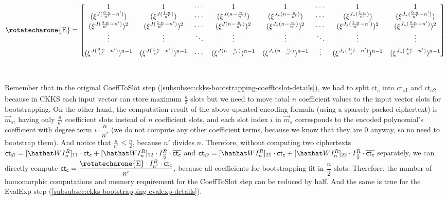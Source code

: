 {\footnotesize{\hspace{-1cm}\noindent $\text{\rotatecharone{E}} = \begin{bmatrix}
1 & 1 & \cdots & 1 & 1 & \cdots & 1 & 1\\
(\xi^{J(\frac{0\cdot n}{n'}-n')}) & (\xi^{J(\frac{1\cdot n}{n'})}) & \cdots & (\xi^{J(n-\frac{n}{n'})}) & (\xi^{J_*(n-\frac{n}{n'})}) & \cdots & (\xi^{J_*(\frac{1\cdot n}{n'})}) & (\xi^{J_*(\frac{0\cdot n}{n'}-n')})\\
(\xi^{J(\frac{0\cdot n}{n'}-n')})^2 & (\xi^{J(\frac{1\cdot n}{n'}-n')})^2 & \cdots & (\xi^{J(n-\frac{n}{n'})})^2 & (\xi^{J_*(n-\frac{n}{n'})})^2 & \cdots & (\xi^{J_*(\frac{1\cdot n}{n'}-n')})^2 & (\xi^{J_*(\frac{0\cdot n}{n'}-n')})^2 \\
\vdots & \vdots & \ddots & \vdots & \vdots & \ddots & \vdots & \vdots \\
(\xi^{J(\frac{0\cdot n}{n'}-n')})^{n-1} & (\xi^{J(\frac{1\cdot n}{n'}-n')})^{n-1} & \cdots & (\xi^{J(n-\frac{n}{n'})})^{n-1} & (\xi^{J_*(n-\frac{n}{n'})})^{n-1} & \vdots & (\xi^{J_*(\frac{1\cdot n}{n'}-n')})^{n-1} & (\xi^{J_*(\frac{0\cdot n}{n'}-n')})^{n-1} 
\end{bmatrix}$}}

$ $

Remember that in the original \textsf{CoeffToSlot} step (\autoref{subsubsec:ckks-bootstrapping-coefftoslot-details}), we had to split \textsf{ct\textsubscript{s}} into \textsf{ct\textsubscript{s1}} and \textsf{ct\textsubscript{s2}} because in CKKS each input vector can store maximum $\frac{n}{2}$ slots but we need to move total $n$ coefficient values to the input vector slots for bootstrapping. On the other hand, the computation result of the above updated encoding formula (using a sparsely packed ciphertext) is $\vec{m}_s$, having only $\frac{n}{n'}$ coefficient slots instead of $n$ coefficient slots, and each slot index $i$ in $\vec{m}_s$ corresponds to the encoded polynomial's coefficient with degree term $i \cdot \dfrac{n}{n'}$ (we do not compute any other coefficient terms, because we know that they are 0 anyway, so no need to bootstrap them). And notice that $\frac{n}{n'} \leq \frac{n}{2}$, because $n'$ divides $n$. Therefore, without computing two ciphertexts $\textsf{ct}_{\textsf{s1}} = [\hathat WI_n^R]_{11} \cdot \textsf{ct\textsubscript{c}} + [\hathat WI_n^R]_{12} \cdot I_{\frac{n}{2}}^R \cdot \mathit{\overline{\textsf{ct\textsubscript{c}}}}$ and $\textsf{ct}_{\textsf{s2}} = [\hathat WI_n^R]_{21} \cdot \textsf{ct\textsubscript{c}} + [\hathat WI_n^R]_{22} \cdot I_{\frac{n}{2}}^R \cdot \mathit{\overline{\textsf{ct\textsubscript{c}}}}$ separately, we can directly compute $\textsf{ct\textsubscript{c}} = \dfrac{ \text{\rotatecharone{E}} \cdot I_{n'}^R \cdot \textsf{ct\textsubscript{c}}}{n'}$, because all coefficients for bootstrapping fit in $\dfrac{n}{2}$ slots. Therefore, the number of homomorphic computations and memory requirement for the \textsf{CoeffToSlot} step can be reduced by half. And the same is true for the \textsf{EvalExp} step (\autoref{subsubsec:ckks-bootstrapping-evalexp-details}).

